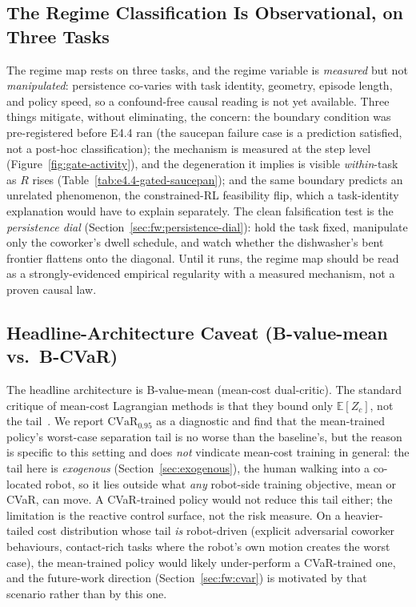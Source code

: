 \documentclass[11pt,a4paper]{report}
\newcommand{\cvar}{\ensuremath{\mathrm{CVaR}}}
\begin{document}
\subsection{The Regime Classification Is Observational, on Three Tasks}
\label{sec:disc:regime-threat}

The regime map rests on three tasks, and the regime variable is
\emph{measured} but not \emph{manipulated}: persistence co-varies
with task identity, geometry, episode length, and policy speed, so a
confound-free causal reading is not yet available. Three things
mitigate, without eliminating, the concern: the boundary condition
was pre-registered before E4.4 ran (the saucepan failure case is a
prediction satisfied, not a post-hoc classification); the mechanism
is measured at the step level (Figure~\ref{fig:gate-activity}), and
the degeneration it implies is visible \emph{within}-task as $R$
rises (Table~\ref{tab:e4.4-gated-saucepan}); and the same boundary
predicts an unrelated phenomenon, the constrained-RL feasibility
flip, which a task-identity explanation would have to explain
separately. The clean falsification test is the \emph{persistence
dial} (Section~\ref{sec:fw:persistence-dial}): hold the task fixed,
manipulate only the coworker's dwell schedule, and watch whether the
dishwasher's bent frontier flattens onto the diagonal. Until it
runs, the regime map should be read as a strongly-evidenced
empirical regularity with a measured mechanism, not a proven causal
law.

\subsection{Headline-Architecture Caveat (B-value-mean vs.\ B-CVaR)}
\label{sec:disc:arch-caveat}

The headline architecture is B-value-mean (mean-cost dual-critic).
The standard critique of mean-cost Lagrangian methods is that they
bound only $\mathbb{E}[Z_c]$, not the tail~\cite{yang2021wcsac}. We
report $\cvar_{0.95}$ as a diagnostic and find that the mean-trained
policy's worst-case separation tail is no worse than the baseline's,
but the reason is specific to this setting and does \emph{not} vindicate
mean-cost training in general: the tail here is \emph{exogenous}
(Section~\ref{sec:exogenous}), the human walking into a co-located
robot, so it lies outside what \emph{any} robot-side training
objective, mean or CVaR, can move. A CVaR-trained policy would not
reduce this tail either; the limitation is the reactive control
surface, not the risk measure. On a heavier-tailed cost distribution
whose tail \emph{is} robot-driven (explicit adversarial coworker
behaviours, contact-rich tasks where the robot's own motion creates
the worst case), the mean-trained policy would likely under-perform a
CVaR-trained one, and the future-work direction
(Section~\ref{sec:fw:cvar}) is motivated by that scenario rather than
by this one.
\end{document}
